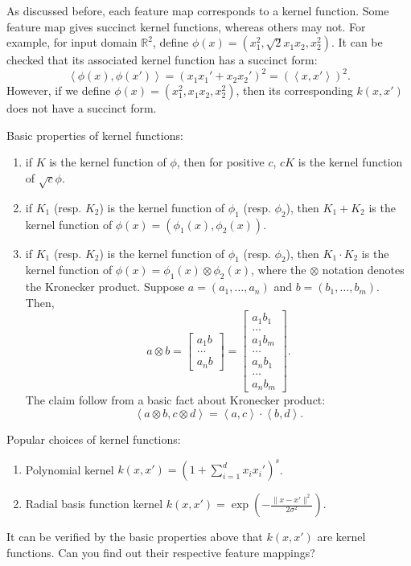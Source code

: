 \documentclass{article}
\newcommand{\RR}{\mathbb{R}} %
\newcommand{\inner}[2]{\left\langle #1,#2 \right\rangle}
\begin{document}
As discussed before, each feature map corresponds to a kernel function. Some feature map gives succinct kernel functions, whereas others may not. For example, for input domain $\RR^2$, define $\phi(x) = (x_1^2, \sqrt{2} x_1 x_2, x_2^2)$. It can be checked that its associated kernel function has a succinct form:
\[ \inner{\phi(x)}{\phi(x')} = (x_1x_1' + x_2x_2')^2 = (\inner{x}{x'})^2. \]
However, if we define $\phi(x) = (x_1^2, x_1 x_2, x_2^2)$, then its corresponding
$k(x,x')$ does not have a succinct form.

Basic properties of kernel functions:
\begin{enumerate}
\item if $K$ is the kernel function of $\phi$, then for positive $c$, $cK$ is the kernel function of $\sqrt{c} \phi$.
\item if $K_1$ (resp. $K_2$) is the kernel function of $\phi_1$ (resp. $\phi_2$), then $K_1 + K_2$ is the kernel function of $\phi(x) = (\phi_1(x), \phi_2(x))$.
\item if $K_1$ (resp. $K_2$) is the kernel function of $\phi_1$ (resp. $\phi_2$), then $K_1 \cdot K_2$ is the kernel function of $\phi(x) = \phi_1(x) \otimes \phi_2(x)$, where the $\otimes$ notation denotes the Kronecker product. Suppose $a = (a_1,\ldots,a_n)$ and $b = (b_1,\ldots,b_m)$. Then,
\[ a \otimes b = \begin{bmatrix} a_1 b \\ \ldots \\ a_n b \end{bmatrix} = \begin{bmatrix} a_1 b_1\\ \ldots \\ a_1 b_m \\ \ldots \\ a_n b_1 \\ \ldots \\ a_n b_m \end{bmatrix}. \]
The claim follow from a basic fact about Kronecker product:
\[ \inner{a \otimes b}{c \otimes d} = \inner{a}{c} \cdot \inner{b}{d}. \]
\end{enumerate}

Popular choices of kernel functions:
\begin{enumerate}
\item Polynomial kernel $k(x,x') = (1 + \sum_{i=1}^d x_i x_i')^s$.
\item Radial basis function kernel $k(x,x') = \exp(-\frac{\|x-x'\|^2}{2\sigma^2})$.
\end{enumerate}
It can be verified by the basic properties above that $k(x,x')$ are kernel functions. Can you find out their respective feature mappings?
\end{document}
